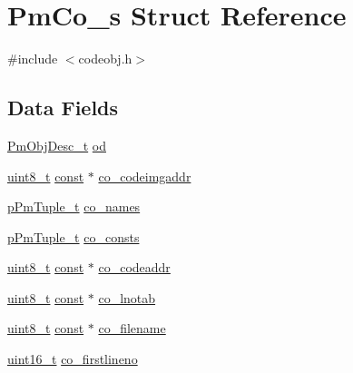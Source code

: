 \hypertarget{struct_pm_co__s}{\section{Pm\-Co\-\_\-s Struct Reference}
\label{struct_pm_co__s}
}


{\ttfamily \#include $<$codeobj.\-h$>$}

\subsection*{Data Fields}
\begin{DoxyCompactItemize}
\item 
\hyperlink{obj_8h_a72d816790acd8eb550fb25268c2b3489}{Pm\-Obj\-Desc\-\_\-t} \hyperlink{struct_pm_co__s_a352492adcc3feda753fb699d0e480726}{od}
\item 
\hyperlink{stdint_8h_aba7bc1797add20fe3efdf37ced1182c5}{uint8\-\_\-t} \hyperlink{group___n_a_m_e_ga7ae6d0e43244213b34de2c2b9aa30da6}{const} $\ast$ \hyperlink{struct_pm_co__s_a4d55730cf6ba1604503fad4b29473c2f}{co\-\_\-codeimgaddr}
\item 
\hyperlink{tuple_8h_a02fea741eaf15db9ac9f4f9ca0433ee1}{p\-Pm\-Tuple\-\_\-t} \hyperlink{struct_pm_co__s_a297d391e5506d9de5d9b9c9895c65be8}{co\-\_\-names}
\item 
\hyperlink{tuple_8h_a02fea741eaf15db9ac9f4f9ca0433ee1}{p\-Pm\-Tuple\-\_\-t} \hyperlink{struct_pm_co__s_a94601e99b78372bfd72227c6b975726b}{co\-\_\-consts}
\item 
\hyperlink{stdint_8h_aba7bc1797add20fe3efdf37ced1182c5}{uint8\-\_\-t} \hyperlink{group___n_a_m_e_ga7ae6d0e43244213b34de2c2b9aa30da6}{const} $\ast$ \hyperlink{struct_pm_co__s_a73eda27e9c1581fe81761a93ce1a528a}{co\-\_\-codeaddr}
\item 
\hyperlink{stdint_8h_aba7bc1797add20fe3efdf37ced1182c5}{uint8\-\_\-t} \hyperlink{group___n_a_m_e_ga7ae6d0e43244213b34de2c2b9aa30da6}{const} $\ast$ \hyperlink{struct_pm_co__s_a9a888f95ac1bda8abbbbbfda5cbce9b8}{co\-\_\-lnotab}
\item 
\hyperlink{stdint_8h_aba7bc1797add20fe3efdf37ced1182c5}{uint8\-\_\-t} \hyperlink{group___n_a_m_e_ga7ae6d0e43244213b34de2c2b9aa30da6}{const} $\ast$ \hyperlink{struct_pm_co__s_a2611e268836e77a080e64eaa5808a534}{co\-\_\-filename}
\item 
\hyperlink{stdint_8h_a273cf69d639a59973b6019625df33e30}{uint16\-\_\-t} \hyperlink{struct_pm_co__s_a6614b16095590b6880f28bbec2476176}{co\-\_\-firstlineno}
\item 

\end{DoxyCompactItemize}
